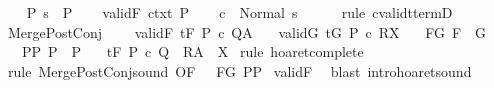 \begin{isabellebody}
\ \ \isamarkupfalse%
\ P{\isacharcolon}\ {\isachardoublequoteopen}s\ {\isasymin}\ P{\isachardoublequoteclose}\isanewline
\ \ \isamarkupfalse%
\ validF\ ctxt\ P\isanewline
\ \ \isamarkupfalse%
\ {\isachardoublequoteopen}{\isasymGamma}{\isasymturnstile}c\ {\isasymdown}\ Normal\ s{\isachardoublequoteclose}\isanewline
\ \ \ \ \isamarkupfalse%
\ {\isacharparenleft}rule\ cvalidt{\isacharunderscore}termD{\isacharparenright}\isanewline
{}\isamarkupfalse%
%
\endisatagproof
{\isafoldproof}%
%
\isadelimproof
\isanewline
%
\endisadelimproof
\isanewline
\isanewline
\isanewline
{}\isamarkupfalse%
\ Merge{\isacharunderscore}PostConj{\isacharcolon}\ \isanewline
\ \ \ validF{\isacharcolon}\ {\isachardoublequoteopen}{\isasymGamma}{\isacharcomma}{\isasymTheta}{\isasymturnstile}\isactrlsub t\isactrlbsub {\isacharslash}F\isactrlesub \ P\ c\ Q{\isacharcomma}A{\isachardoublequoteclose}\isanewline
\ \ \ validG{\isacharcolon}\ {\isachardoublequoteopen}{\isasymGamma}{\isacharcomma}{\isasymTheta}{\isasymturnstile}\isactrlsub t\isactrlbsub {\isacharslash}G\isactrlesub \ P{\isacharprime}\ c\ R{\isacharcomma}X{\isachardoublequoteclose}\isanewline
\ \ \ F{\isacharunderscore}G{\isacharcolon}\ {\isachardoublequoteopen}F\ {\isasymsubseteq}\ G{\isachardoublequoteclose}\isanewline
\ \ \ P{\isacharunderscore}P{\isacharprime}{\isacharcolon}\ {\isachardoublequoteopen}P\ {\isasymsubseteq}\ P{\isacharprime}{\isachardoublequoteclose}\isanewline
\ \ \ {\isachardoublequoteopen}{\isasymGamma}{\isacharcomma}{\isasymTheta}{\isasymturnstile}\isactrlsub t\isactrlbsub {\isacharslash}F\isactrlesub \ P\ c\ {\isacharparenleft}Q\ {\isasyminter}\ R{\isacharparenright}{\isacharcomma}{\isacharparenleft}A\ {\isasyminter}\ X{\isacharparenright}{\isachardoublequoteclose}\isanewline
%
\isadelimproof
%
\endisadelimproof
%
\isatagproof
{}\isamarkupfalse%
\ {\isacharparenleft}rule\ hoaret{\isacharunderscore}complete{\isacharprime}{\isacharparenright}\isanewline
{}\isamarkupfalse%
\ {\isacharparenleft}rule\ Merge{\isacharunderscore}PostConj{\isacharunderscore}sound\ {\isacharbrackleft}OF\ {\isacharunderscore}\ {\isacharunderscore}\ F{\isacharunderscore}G\ P{\isacharunderscore}P{\isacharprime}{\isacharbrackright}{\isacharparenright}\isanewline
{}\isamarkupfalse%
\ validF\ \isamarkupfalse%
\ {\isacharparenleft}blast\ intro{\isacharcolon}hoaret{\isacharunderscore}sound{\isacharparenright}\isanewline

\end{isabellebody}
